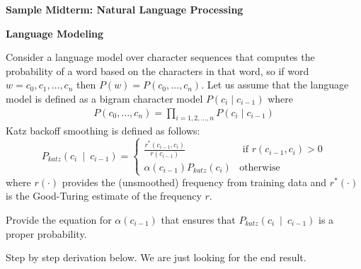 \documentclass[11pt]{article}
\begin{document}

\begin{center}
{\Large\bf
Sample Midterm: Natural Language Processing
}
\end{center}

\begin{exe}

\ex \textbf{Language Modeling}

Consider a language model over character sequences that computes the probability of
a word based on the characters in that word, so if word $w = c_0, c_1, \ldots, c_n$ then
$P(w) = P(c_0, \ldots, c_n)$. Let us assume that the language model is defined as
a bigram character model $P(c_i \mid c_{i-1})$ where 
\begin{eqnarray*} 
P(c_0, \ldots, c_n) = \prod_{i=1,2,\ldots,n} P(c_i \mid c_{i-1}) \label{eqn:bigram} 
\end{eqnarray*}
Katz backoff smoothing is defined as follows:
\[ P_{\textit{katz}}(c_i~\mid~c_{i-1}) = \left\{
\begin{array}{cl}
\frac{ r^\ast(c_{i-1}, c_i) }{ r(c_{i-1}) } & \textrm{ if $r(c_{i-1}, c_i) > 0$} \\
\alpha(c_{i-1}) P_{\textit{katz}} (c_i) & \textrm{otherwise}
\end{array}
\right. \]
where $r(\cdot)$ provides the (unsmoothed) frequency from training data and $r^\ast(\cdot)$ is the Good-Turing estimate of the frequency $r$.
%
%

Provide the equation for $\alpha(c_{i-1})$ that ensures that $P_{\textit{katz}}(c_i~\mid~c_{i-1})$ is a proper probability.

\begin{soln}

Step by step derivation below. We are just looking for the end result.


\end{soln}
\end{exe}
\end{document}
